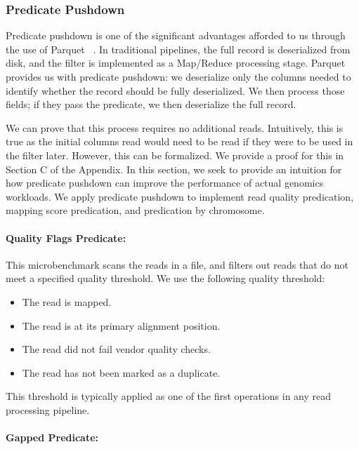 \documentclass[10pt,twocolumn]{article}
\theoremstyle{plain}
\begin{document}
\subsubsection{Predicate Pushdown}
\label{sec:predicate-pushdown}

Predicate pushdown is one of the significant advantages afforded to us through the use of Parquet	~\cite{parquet}. In traditional
pipelines, the full record is deserialized from disk, and the filter is implemented as a Map/Reduce processing stage. Parquet provides
us with predicate pushdown: we deserialize only the columns needed to identify whether the record should be fully deserialized. We
then process those fields; if they pass the predicate, we then deserialize the full record.

We can prove that this process requires no additional reads. Intuitively, this is true as the initial columns read would need to be read
if they were to be used in the filter later. However, this can be formalized. We provide a proof for this in Section C of the Appendix.
In this section, we seek to provide an intuition for how predicate pushdown can improve the performance of actual genomics workloads.
We apply predicate pushdown to implement read quality predication, mapping score predication, and predication by chromosome. 

\paragraph{Quality Flags Predicate:}
\label{sec:quality-flags-predicate}

This microbenchmark scans the reads in a file, and filters out reads that do not meet a specified quality threshold. We use the following
quality threshold:

\begin{itemize}
\item The read is mapped.
\item The read is at its primary alignment position.
\item The read did not fail vendor quality checks.
\item The read has not been marked as a duplicate.
\end{itemize}
This threshold is typically applied as one of the first operations in any read processing pipeline.

\paragraph{Gapped Predicate:}
\label{sec:gapped-predicate}
\end{document}
